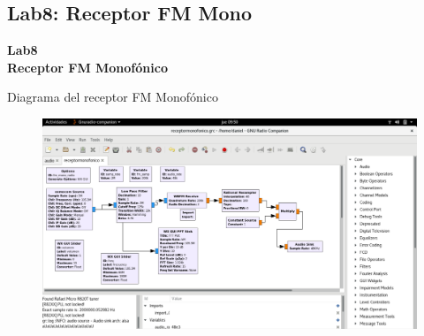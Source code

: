 \subsection{Lab8: Receptor FM Mono}
\begin{frame}{}


\bfseries{\textrm{\LARGE Lab8\\ \Large Receptor FM Monofónico}}
\raggedright
\end{frame}

\begin{frame}{Diagrama del receptor FM Monofónico}


\begin{figure}[H]
\centering
\vspace{-3mm}
\includegraphics[width=\textwidth]{parte3/lab8/pdf/lab8_1.pdf}
\end{figure}

\end{frame}

